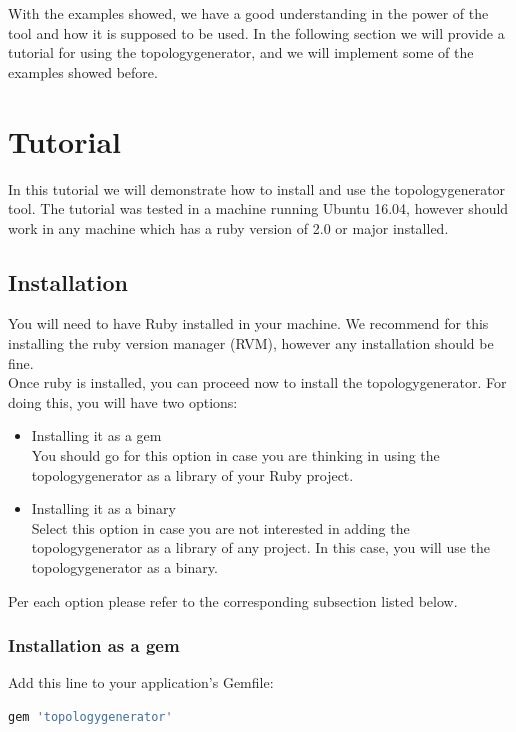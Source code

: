 With the examples showed, we have a good understanding in the power of the tool and how it is supposed to be used. In the following section we will provide a tutorial for using the topologygenerator, and we will implement some of the examples showed before.

\section{Tutorial}

In this tutorial we will demonstrate how to install and use the topologygenerator tool. The tutorial was tested in a machine running Ubuntu 16.04, however should work in any machine which has a ruby version of 2.0 or major installed. \\

\subsection{Installation}

You will need to have Ruby installed in your machine. We recommend for this installing the ruby version manager (RVM), however any installation should be fine.\\

Once ruby is installed, you can proceed now to install the topologygenerator. For doing this, you will have two options: 
\begin{itemize}
\item Installing it as a gem \\
You should go for this option in case you are thinking in using the topologygenerator as a library of your Ruby project. 
\item Installing it as a binary \\
Select this option in case you are not interested in adding the topologygenerator as a library of any project. In this case, you will use the topologygenerator as a binary.
\end{itemize}

Per each option please refer to the corresponding subsection listed below.

\subsubsection{Installation as a gem}

Add this line to your application's Gemfile:

\begin{lstlisting}[language=Ruby,breaklines=true]
gem 'topologygenerator'
\end{lstlisting}


